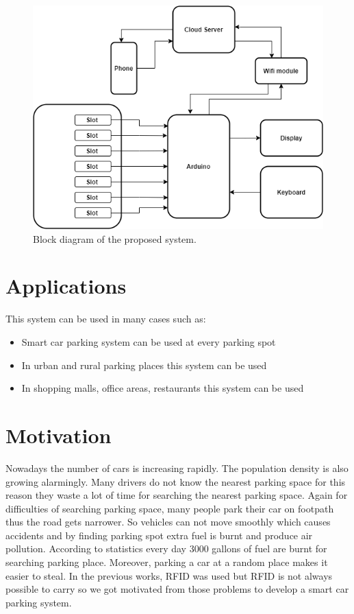 \begin{figure}[H]
\centering
\includegraphics[width=1.0\textwidth]{figures/BlockDig.png}
\caption{Block diagram of the proposed system.}
\label{block}
\end{figure}


\section{Applications}
This system can be used in many cases such as:
\begin{itemize}
    \item Smart car parking system can be used at every parking spot
    \item In urban and rural parking places this system can be used 
    \item In shopping malls, office areas, restaurants this system can be used
\end{itemize}

\section{Motivation}
Nowadays the number of cars is increasing rapidly. The population density is also growing alarmingly. Many drivers do not know the nearest parking space for this reason they waste a lot of time for searching the nearest parking space. Again for difficulties of searching parking space, many people park their car on footpath thus the road gets narrower. So vehicles can not move smoothly which causes accidents and by finding parking spot extra fuel is burnt and produce air pollution. According to statistics every day 3000 gallons of fuel are burnt for searching parking place\cite{}. Moreover, parking a car at a random place makes it easier to steal. In the previous works, RFID was used but RFID is not always possible to carry so we got motivated from those problems to develop a smart car parking system. 

